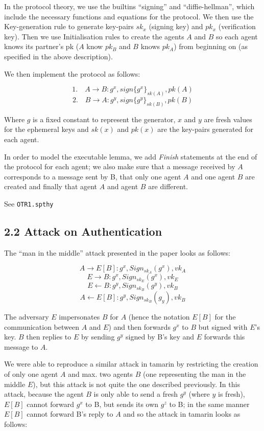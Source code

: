 \documentclass[
]{article}
\begin{document}
In the protocol theory, we use the builtins ``signing'' and
``diffie-hellman'', which include the necessary functions and equations for the protocol. We then use the Key-generation rule to generate key-pairs $sk_x$ (signing key) and $pk_x$ (verification key). Then we use Initialisation rules to create the agents $A$ and $B$ so each agent knows its partner's pk ($A$ know $pk_B$ and $B$ knows $pk_A$) from beginning on (as specified in the above description).

We then implement the protocol as follows:

\[ \text{1.} \quad A \rightarrow B: g^x, sign\{g^x\}_{sk(A)}, pk(A) \]
\[ \text{2.} \quad B \rightarrow A: g^y, sign\{g^y\}_{sk(B)}, pk(B) \]

Where $g$ is a fixed constant to represent the generator, $x$ and $y$ are fresh values for the ephemeral keys and
$ sk(x)$ and $pk(x)$ are the key-pairs generated for each agent.

In order to model the executable lemma, we add \emph{Finish} statements at the end of the protocol for each agent; we also make sure that a message received by $A$ corresponds to a message sent by B, that only one agent $A$ and one agent $B$ are created and finally that agent $A$ and agent $B$ are different.

See \texttt{OTR1.spthy}

\newpage
\hypertarget{attack-on-authentication}{%
\subsection{2.2 Attack on Authentication}\label{attack-on-authentication}}

The ``man in the middle'' attack presented in the paper looks as follows:

\[ A \rightarrow E[B] : g^x, Sign_{sk_A} (g^x), vk_A \]
\[ E \rightarrow B : g^x, Sign_{sk_E} (g^x), vk_E \]
\[ E \leftarrow B : g^y, Sign_{sk_B} (g^y), vk_B \]
\[ A \leftarrow E[B] : g^y, Sign_{sk_B} (g_y), vk_B \]

The adversary $E$ impersonates $B$ for $A$ (hence the notation $E[B]$ for the communication between $A$ and $E$) and then forwards $g^x$ to $B$ but signed with $E$'s key. $B$ then replies to $E$ by sending $g^y$ signed by B's key and $E$ forwards this message to $A$.

We were able to reproduce a similar attack in tamarin by restricting the creation of only one agent $A$ and  max. two agents $B$ (one representing the man in the middle $E$), but this attack is not quite the one described previously. In this attack, because the agent $B$ is only able to send a fresh $g^y$ (where $y$ is fresh), $E[B]$ cannot forward $g^x$ to B, but sends its own $g^z$ to B; in the same manner $E[B]$ cannot forward B's reply to $A$ and so the attack in tamarin looks as follows:
\end{document}
